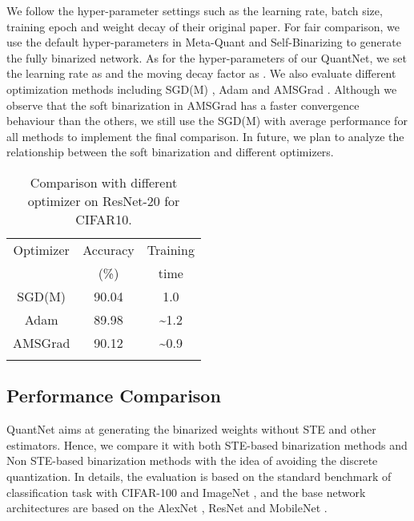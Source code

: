 \documentclass[runningheads]{llncs}
\begin{document}
We follow the hyper-parameter settings such as the learning rate, batch size,
training epoch and weight decay of their original paper.
For fair comparison, we use the default hyper-parameters
in Meta-Quant \cite{chen2019meta} and Self-Binarizing \cite{lahoud2019self} to generate the fully binarized network.
As for the hyper-parameters of our QuantNet,
we set the learning rate as  and the moving decay factor as .
We also evaluate different optimization methods including
SGD(M) \cite{sgd1951}, Adam \cite{adam2014} and AMSGrad \cite{amsgrad2018}.
Although we observe that the soft binarization in AMSGrad
has a faster convergence behaviour than the others,
we still use the SGD(M) with average performance for all methods to implement the final comparison.
In future, we plan to analyze the relationship between the soft binarization and different optimizers.
\begin{table}[htb]
\begin{center}
	\centering
    \begin{tabular}{ccc}
    \hline
    Optimizer       & Accuracy    & Training   \\
                    &  (\%)       &  time      \\
    \hline
    SGD(M)         & 90.04     &   1.0      \\
    Adam           & 89.98     &   \textasciitilde 1.2      \\
    AMSGrad        & 90.12     &   \textasciitilde 0.9      \\
    \hline
    \noalign{\smallskip}
    \end{tabular}
    \caption{Comparison with different optimizer on ResNet-20 for CIFAR10.}
    \label{tab:perf_op}
\end{center}
\end{table}


\subsection{Performance Comparison}
QuantNet aims at generating the binarized weights without STE and other estimators.
Hence, we compare it with both STE-based binarization
methods \cite{courbariaux2015binaryconnect,Zhou2016DoReFa,hou2016loss,Zhang2018LQ,jung2019learning}
and Non STE-based binarization
methods \cite{bai2019prox,chen2019meta,Uhlich2019DQ,lahoud2019self}
with the idea of avoiding the discrete quantization.
In details, the evaluation is based on the standard benchmark of classification task
with CIFAR-100 \cite{cifar10} and ImageNet \cite{Deng2009},
and the base network architectures are based on the
AlexNet \cite{Krizhevsky2012}, ResNet \cite{he2016deep} and MobileNet \cite{sandler2018mobilenetv2}.
\end{document}
